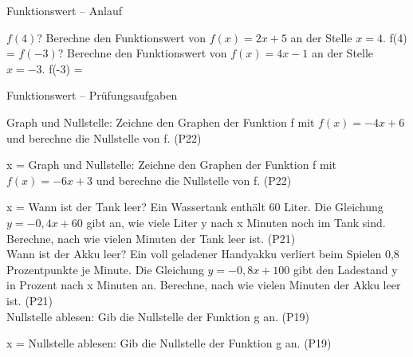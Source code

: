 \setcounter{aufgabe}{0}

\begin{aufgabe}{Funktionswert – Anlauf}
\begin{teile}
\teil $f(4)$? Berechne den Funktionswert von $f(x) = 2x + 5$ an der Stelle $x = 4$. f(4) = \leerfeld
\teil $f(-3)$? Berechne den Funktionswert von $f(x) = 4x - 1$ an der Stelle $x = -3$. f(-3) = \leerfeld
\end{teile}
\end{aufgabe}

\begin{aufgabe}{Funktionswert – Prüfungsaufgaben}
\begin{teile}
\teil Graph und Nullstelle: Zeichne den Graphen der Funktion f mit $f(x) = -4x + 6$ und berechne die Nullstelle von f. \hfill (P22) \\

\begin{ksys}[xmin=-4,xmax=4,ymin=-4,ymax=7] \end{ksys}
x = \leerfeld
\teil Graph und Nullstelle: Zeichne den Graphen der Funktion f mit $f(x) = -6x + 3$ und berechne die Nullstelle von f. \hfill (P22) \\

\begin{ksys}[xmin=-4,xmax=4,ymin=-4,ymax=4] \end{ksys}
x = \leerfeld
\teil Wann ist der Tank leer? Ein Wassertank enthält 60 Liter. Die Gleichung $y = -0{,}4x + 60$ gibt an, wie viele Liter y nach x Minuten noch im Tank sind. Berechne, nach wie vielen Minuten der Tank leer ist. \hfill (P21) \\ \leerfeld[min]
\teil Wann ist der Akku leer? Ein voll geladener Handyakku verliert beim Spielen 0{,}8 Prozentpunkte je Minute. Die Gleichung $y = -0{,}8x + 100$ gibt den Ladestand y in Prozent nach x Minuten an. Berechne, nach wie vielen Minuten der Akku leer ist. \hfill (P21) \\ \leerfeld[min]
\teil Nullstelle ablesen: Gib die Nullstelle der Funktion g an. \hfill (P19) \\

\begin{ksys}[xmin=-5,xmax=5,ymin=-5,ymax=5,ablesen]  \end{ksys}
x = \leerfeld
\teil Nullstelle ablesen: Gib die Nullstelle der Funktion g an. \hfill (P19) \\


\end{teile}
\end{aufgabe}
